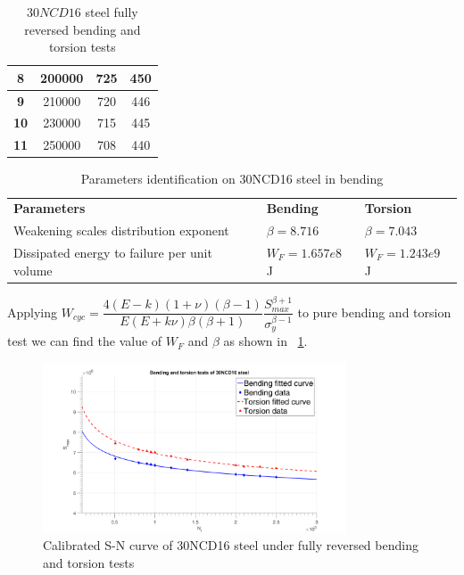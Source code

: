 \documentclass[3p,times,number,review]{elsarticle}
\newcommand{\figref}[1]{\figurename~\ref{#1}}
\begin{document}
\begin{table}[!h]
\begin{tabular}{|c|c|c|c|}
		\textbf{8}     & 200000                                                            & 725                &   450                                                                             \\ \hline
		\textbf{9}     & 210000                                                            & 720               &   446                                                                              \\ \hline
		\textbf{10}    & 230000                                                            & 715                &   445                                                                             \\ \hline
		\textbf{11}    & 250000                                                            & 708              &   440                                                                               \\ \hline
	\end{tabular}
	\caption{$30NCD16$ steel fully reversed bending and torsion tests}
	\label{tab:tests30NCD16}
\end{table}

\begin{table}[!h]
	\centering
	\begin{tabular}{lll}
		\hline
		\textbf{Parameters}                                         & \textbf{Bending}                &    \textbf{Torsion}   \\ 
Weakening scales distribution exponent                  & $\beta=8.716$                       &   $\beta=7.043$    \\
Dissipated energy to failure per unit volume                & $W_F=1.657e8$ J                     & $W_F=1.243e9$ J   \\
    \hline
	\end{tabular}
	\caption{Parameters identification on 30NCD16 steel in bending}
\label{tab:parameters}
\end{table}
Applying $W_{cyc}=\dfrac{4(E-k)(1+\nu)\left( \beta-1\right) }{ E(E+k\nu)\beta\left( \beta+1\right) }\dfrac{S_{max}^{\beta+1}}{ \sigma_y^{\beta-1}}$ to pure bending and torsion test we can  find the value of $W_F$ and $\beta$ as shown in \figref{30NCD60noH}.
\begin{figure}[!h]
	\centering
	\includegraphics[width=0.8\textwidth]{figures//30NCD60noH.png} 
	\caption{Calibrated S-N curve of 30NCD16 steel under fully reversed bending and torsion tests}
	\label{30NCD60noH}
\end{figure}
\end{document}
